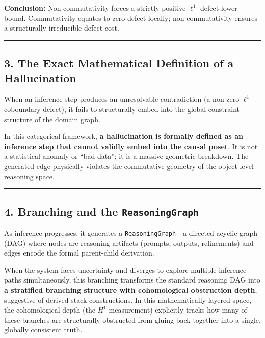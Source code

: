 \documentclass[
]{article}
\begin{document}
\textbf{Conclusion:} Non-commutativity forces a strictly positive
\(\ell^1\) defect lower bound. Commutativity equates to zero defect
locally; non-commutativity ensures a structurally irreducible defect
cost.

\begin{center}\rule{0.5\linewidth}{0.5pt}\end{center}

\subsection{3. The Exact Mathematical Definition of a
Hallucination}\label{the-exact-mathematical-definition-of-a-hallucination}

When an inference step produces an unresolvable contradiction (a
non-zero \(\ell^1\) coboundary defect), it fails to structurally embed
into the global constraint structure of the domain graph.

In this categorical framework, \textbf{a hallucination is formally
defined as an inference step that cannot validly embed into the causal
poset}. It is not a statistical anomaly or ``bad data''; it is a massive
geometric breakdown. The generated edge physically violates the
commutative geometry of the object-level reasoning space.

\begin{center}\rule{0.5\linewidth}{0.5pt}\end{center}

\subsection{\texorpdfstring{4. Branching and the
\texttt{ReasoningGraph}}{4. Branching and the ReasoningGraph}}\label{branching-and-the-reasoninggraph}

As inference progresses, it generates a \texttt{ReasoningGraph}---a
directed acyclic graph (DAG) where nodes are reasoning artifacts
(prompts, outputs, refinements) and edges encode the formal parent-child
derivation.

When the system faces uncertainty and diverges to explore multiple
inference paths simultaneously, this branching transforms the standard
reasoning DAG into \textbf{a stratified branching structure with
cohomological obstruction depth}, suggestive of derived stack
constructions. In this mathematically layered space, the cohomological
depth (the \(H^1\) measurement) explicitly tracks how many of these
branches are structurally obstructed from gluing back together into a
single, globally consistent truth.
\end{document}
